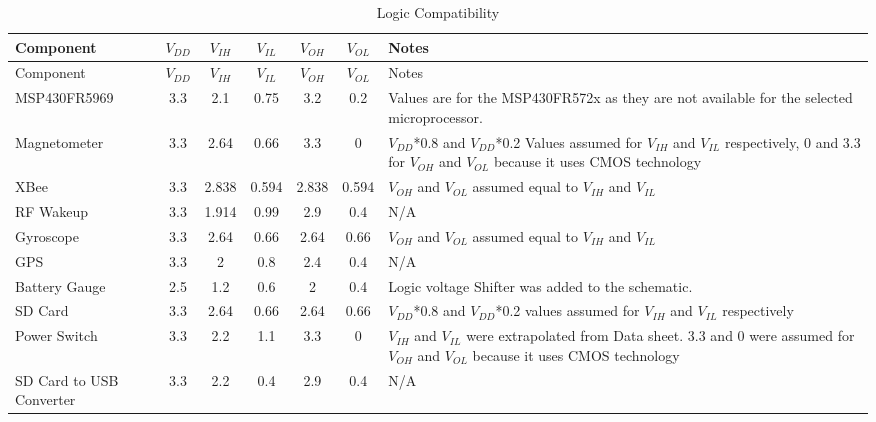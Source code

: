 \begin{center}

    \begin{longtable}{|p{1.2in}|c|c|c|c|c|p{1.8in}|}
    \caption{Logic Compatibility  \label{tab:logicComp}} \\
     \hline
    \rowcolor{Gray}
   Component & $V_{DD}$   & $V_{IH}$   & $V_{IL}$   & $V_{OH}$   & $V_{OL}$   & Notes \\
    \hline \hline \endfirsthead
    
         \hline
    \rowcolor{Gray}
    Component & $V_{DD}$   & $V_{IH}$   & $V_{IL}$   & $V_{OH}$   & $V_{OL}$   & Notes \\
    \hline \hline \endhead
    
    \endfoot

    MSP430FR5969 & 3.3   & 2.1   & 0.75  & 3.2   & 0.2   & Values are for the MSP430FR572x as they are not available for the selected microprocessor. \\ \hline
    Magnetometer & 3.3   & 2.64  & 0.66  & 3.3   & 0     & $V_{DD}$*0.8 and $V_{DD}$*0.2 Values assumed for $V_{IH}$ and $V_{IL}$ respectively, 0 and 3.3 for $V_{OH}$ and $V_{OL}$ because it uses CMOS technology \\ \hline
    XBee  & 3.3   & 2.838 & 0.594 & 2.838 & 0.594 & $V_{OH}$ and $V_{OL}$ assumed equal to $V_{IH}$ and $V_{IL}$ \\ \hline
    RF Wakeup & 3.3   & 1.914 & 0.99  & 2.9   & 0.4   & N/A \\ \hline
    Gyroscope & 3.3   & 2.64  & 0.66  & 2.64  & 0.66  & $V_{OH}$ and $V_{OL}$ assumed equal to $V_{IH}$ and $V_{IL}$ \\ \hline
    GPS   & 3.3   & 2     & 0.8   & 2.4   & 0.4   & N/A \\ \hline
    Battery Gauge & 2.5   & 1.2   & 0.6   & 2     & 0.4   & Logic voltage Shifter was added to the schematic. \\ \hline
    SD Card & 3.3   & 2.64  & 0.66  & 2.64  & 0.66  & $V_{DD}$*0.8 and $V_{DD}$*0.2 values assumed for $V_{IH}$ and $V_{IL}$ respectively \\\hline
    Power Switch & 3.3   & 2.2   & 1.1   & 3.3   & 0     & $V_{IH}$ and $V_{IL}$ were extrapolated from Data sheet. 3.3 and 0 were assumed for $V_{OH}$ and $V_{OL}$ because it uses CMOS technology \\ \hline
    SD Card to USB Converter & 3.3   & 2.2   & 0.4   & 2.9   & 0.4   & N/A \\ \hline
    \end{longtable}%
  
\end{center}%


